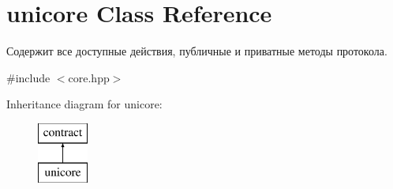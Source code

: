 \hypertarget{classunicore}{}\section{unicore Class Reference}
\label{classunicore}


Содержит все доступные действия, публичные и приватные методы протокола.  




{\ttfamily \#include $<$core.\+hpp$>$}

Inheritance diagram for unicore\+:\begin{figure}[H]
\begin{center}
\leavevmode
\includegraphics[height=2.000000cm]{classunicore}
\end{center}
\end{figure}
